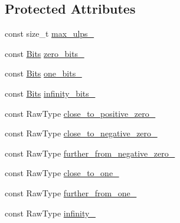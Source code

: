 \subsection*{Protected Attributes}
\begin{DoxyCompactItemize}
\item 
const size\+\_\+t \hyperlink{classtesting_1_1gmock__matchers__test_1_1_floating_point_test_a253abb77b6555a98a100c253224bb860}{max\+\_\+ulps\+\_\+}
\item 
const \hyperlink{classtesting_1_1gmock__matchers__test_1_1_floating_point_test_addf899bd832ae51103198d201d2f2ea2}{Bits} \hyperlink{classtesting_1_1gmock__matchers__test_1_1_floating_point_test_afb9b6beb1f152693155cf7db4e1fc4d2}{zero\+\_\+bits\+\_\+}
\item 
const \hyperlink{classtesting_1_1gmock__matchers__test_1_1_floating_point_test_addf899bd832ae51103198d201d2f2ea2}{Bits} \hyperlink{classtesting_1_1gmock__matchers__test_1_1_floating_point_test_ae26de8492d307d2b4c30f6b952d9a412}{one\+\_\+bits\+\_\+}
\item 
const \hyperlink{classtesting_1_1gmock__matchers__test_1_1_floating_point_test_addf899bd832ae51103198d201d2f2ea2}{Bits} \hyperlink{classtesting_1_1gmock__matchers__test_1_1_floating_point_test_a3c25f403d51e6c8ed3fe7856cab1330b}{infinity\+\_\+bits\+\_\+}
\item 
const Raw\+Type \hyperlink{classtesting_1_1gmock__matchers__test_1_1_floating_point_test_a750555206ab9d5959d6dc84f8a760c57}{close\+\_\+to\+\_\+positive\+\_\+zero\+\_\+}
\item 
const Raw\+Type \hyperlink{classtesting_1_1gmock__matchers__test_1_1_floating_point_test_a641f5e223c25b6d6fb108b322acaa39d}{close\+\_\+to\+\_\+negative\+\_\+zero\+\_\+}
\item 
const Raw\+Type \hyperlink{classtesting_1_1gmock__matchers__test_1_1_floating_point_test_acc020c4d830d9e9d910b92bb466d540f}{further\+\_\+from\+\_\+negative\+\_\+zero\+\_\+}
\item 
const Raw\+Type \hyperlink{classtesting_1_1gmock__matchers__test_1_1_floating_point_test_a34c97dc5dc07ea62764de87fdd8b7764}{close\+\_\+to\+\_\+one\+\_\+}
\item 
const Raw\+Type \hyperlink{classtesting_1_1gmock__matchers__test_1_1_floating_point_test_a049ba2d5d371e8aea6ada1ab5312b1bb}{further\+\_\+from\+\_\+one\+\_\+}
\item 
const Raw\+Type \hyperlink{classtesting_1_1gmock__matchers__test_1_1_floating_point_test_a21d8a019a6365ddff80e301a6163f43f}{infinity\+\_\+}
\item 

\end{DoxyCompactItemize}
